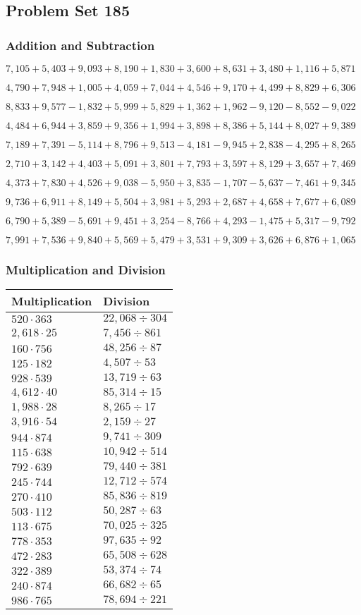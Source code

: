 \hypertarget{problem-set-185}{%
\subsection{Problem Set 185}\label{problem-set-185}}

\hypertarget{addition-and-subtraction}{%
\subsubsection{Addition and
Subtraction}\label{addition-and-subtraction}}

\(7,105+5,403+9,093+8,190+1,830+3,600+8,631+3,480+1,116+5,871\)

\(4,790+7,948+1,005+4,059+7,044+4,546+9,170+4,499+8,829+6,306\)

\(8,833+9,577-1,832+5,999+5,829+1,362+1,962-9,120-8,552-9,022\)

\(4,484+6,944+3,859+9,356+1,994+3,898+8,386+5,144+8,027+9,389\)

\(7,189+7,391-5,114+8,796+9,513-4,181-9,945+2,838-4,295+8,265\)

\(2,710+3,142+4,403+5,091+3,801+7,793+3,597+8,129+3,657+7,469\)

\(4,373+7,830+4,526+9,038-5,950+3,835-1,707-5,637-7,461+9,345\)

\(9,736+6,911+8,149+5,504+3,981+5,293+2,687+4,658+7,677+6,089\)

\(6,790+5,389-5,691+9,451+3,254-8,766+4,293-1,475+5,317-9,792\)

\(7,991+7,536+9,840+5,569+5,479+3,531+9,309+3,626+6,876+1,065\)

\hypertarget{multiplication-and-division}{%
\subsubsection{Multiplication and
Division}\label{multiplication-and-division}}

\begin{longtable}[]{@{}ll@{}}
\toprule
Multiplication & Division\tabularnewline
\midrule
\endhead
\(520\cdot363\) & \(22,068÷304\)\tabularnewline
\(2,618\cdot25\) & \(7,456÷861\)\tabularnewline
\(160\cdot756\) & \(48,256÷87\)\tabularnewline
\(125\cdot182\) & \(4,507÷53\)\tabularnewline
\(928\cdot539\) & \(13,719÷63\)\tabularnewline
\(4,612\cdot40\) & \(85,314÷15\)\tabularnewline
\(1,988\cdot28\) & \(8,265÷17\)\tabularnewline
\(3,916\cdot54\) & \(2,159÷27\)\tabularnewline
\(944\cdot874\) & \(9,741÷309\)\tabularnewline
\(115\cdot638\) & \(10,942÷514\)\tabularnewline
\(792\cdot639\) & \(79,440÷381\)\tabularnewline
\(245\cdot744\) & \(12,712÷574\)\tabularnewline
\(270\cdot410\) & \(85,836÷819\)\tabularnewline
\(503\cdot112\) & \(50,287÷63\)\tabularnewline
\(113\cdot675\) & \(70,025÷325\)\tabularnewline
\(778\cdot353\) & \(97,635÷92\)\tabularnewline
\(472\cdot283\) & \(65,508÷628\)\tabularnewline
\(322\cdot389\) & \(53,374÷74\)\tabularnewline
\(240\cdot874\) & \(66,682÷65\)\tabularnewline
\(986\cdot765\) & \(78,694÷221\)\tabularnewline
\bottomrule
\end{longtable}
